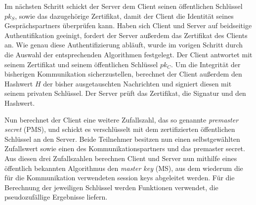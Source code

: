 Im nächsten Schritt schickt der Server dem Client seinen öffentlichen Schlüssel $pk_S$, sowie das dazugehörige Zertifikat, damit der Client die Identität seines
Gesprächspartners überprüfen kann. Haben sich Client und Server auf beidseitige Authentifikation geeinigt, fordert der Server außerdem das Zertifikat des
Clients an.
Wie genau diese Authentifizierung abläuft, wurde im vorigen Schritt durch die Auswahl der entsprechenden Algorithmen festgelegt. Der Client antwortet mit
seinem Zertifikat und seinem öffentlichen Schlüssel $pk_C$. Um die Integrität der bisherigen Kommunikation sicherzustellen, berechnet der Client außerdem den Hashwert $H$
der bisher ausgetauschten Nachrichten und signiert diesen mit seinem privaten Schlüssel. Der Server prüft das Zertifikat, die Signatur und den Hashwert.

Nun berechnet der Client eine weitere Zufallszahl, das so genannte \emph{premaster secret} (PMS), und schickt es verschlüsselt mit dem
zertifizierten öffentlichen Schlüssel an den Server. Beide Teilnehmer besitzen nun einen selbstgewählten Zufallswert sowie einen des
Kommunikationspartners und das premaster secret. Aus diesen drei Zufallszahlen berechnen Client und Server nun mithilfe eines öffentlich bekannten
Algorithmus den \emph{master key} (MS), aus dem wiederum die für die Kommunikation verwendeten session keys abgeleitet werden.
Für die Berechnung der jeweiligen Schlüssel werden Funktionen verwendet, die pseudozufällige Ergebnisse liefern.

